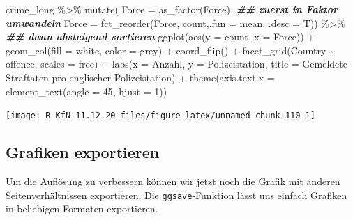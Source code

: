 \documentclass[
]{book}
\newenvironment{Shaded}{\begin{snugshade}}{\end{snugshade}}
\newcommand{\AttributeTok}[1]{\textcolor[rgb]{0.77,0.63,0.00}{#1}}
\newcommand{\DecValTok}[1]{\textcolor[rgb]{0.00,0.00,0.81}{#1}}
\newcommand{\DocumentationTok}[1]{\textcolor[rgb]{0.56,0.35,0.01}{\textbf{\textit{#1}}}}
\newcommand{\FunctionTok}[1]{\textcolor[rgb]{0.00,0.00,0.00}{#1}}
\newcommand{\NormalTok}[1]{#1}
\newcommand{\SpecialCharTok}[1]{\textcolor[rgb]{0.00,0.00,0.00}{#1}}
\newcommand{\StringTok}[1]{\textcolor[rgb]{0.31,0.60,0.02}{#1}}
\begin{document}
\begin{Shaded}
\begin{Highlighting}[]
\NormalTok{crime\_long }\SpecialCharTok{\%\textgreater{}\%} 
  \FunctionTok{mutate}\NormalTok{(}
      \AttributeTok{Force =} \FunctionTok{as\_factor}\NormalTok{(Force), }\DocumentationTok{\#\# zuerst in Faktor umwandeln}
      \AttributeTok{Force =} \FunctionTok{fct\_reorder}\NormalTok{(Force, count,}\AttributeTok{.fun =}\NormalTok{ mean, }\AttributeTok{.desc =}\NormalTok{ T)) }\SpecialCharTok{\%\textgreater{}\%} \DocumentationTok{\#\# dann absteigend sortieren}
\FunctionTok{ggplot}\NormalTok{(}\FunctionTok{aes}\NormalTok{(}\AttributeTok{y =}\NormalTok{ count,}
             \AttributeTok{x =}\NormalTok{ Force)) }\SpecialCharTok{+}
  \FunctionTok{geom\_col}\NormalTok{(}\AttributeTok{fill =} \StringTok{\textquotesingle{}white\textquotesingle{}}\NormalTok{,}
           \AttributeTok{color =} \StringTok{\textquotesingle{}grey\textquotesingle{}}\NormalTok{) }\SpecialCharTok{+}
  \FunctionTok{coord\_flip}\NormalTok{() }\SpecialCharTok{+}
  \FunctionTok{facet\_grid}\NormalTok{(Country }\SpecialCharTok{\textasciitilde{}}\NormalTok{ offence, }
             \AttributeTok{scales =} \StringTok{\textquotesingle{}free\textquotesingle{}}\NormalTok{) }\SpecialCharTok{+}
  \FunctionTok{labs}\NormalTok{(}\AttributeTok{x =} \StringTok{\textquotesingle{}Anzahl\textquotesingle{}}\NormalTok{,}
       \AttributeTok{y =} \StringTok{\textquotesingle{}Polizeistation\textquotesingle{}}\NormalTok{,}
       \AttributeTok{title =} \StringTok{\textquotesingle{}Gemeldete Straftaten pro englischer Polizeistation\textquotesingle{}}\NormalTok{) }\SpecialCharTok{+}
  \FunctionTok{theme}\NormalTok{(}\AttributeTok{axis.text.x =} \FunctionTok{element\_text}\NormalTok{(}\AttributeTok{angle =} \DecValTok{45}\NormalTok{,}
                                   \AttributeTok{hjust =} \DecValTok{1}\NormalTok{))}
\end{Highlighting}
\end{Shaded}

\begin{center}\texttt{[image: R---KfN-11.12.20\_files/figure-latex/unnamed-chunk-110-1]} \end{center}

\hypertarget{grafiken-exportieren}{%
\subsection{Grafiken exportieren}\label{grafiken-exportieren}}

Um die Auflösung zu verbessern können wir jetzt noch die Grafik mit anderen Seitenverhältnissen exportieren. Die \texttt{ggsave}-Funktion lässt uns einfach Grafiken in beliebigen Formaten exportieren.
\end{document}
